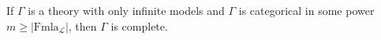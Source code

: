 If $\Gamma$ is a theory with only infinite models and $\Gamma$ is categorical in some power $m \geq |\text{Fmla}_{\mathcal{L}}|$, then $\Gamma$ is complete.
